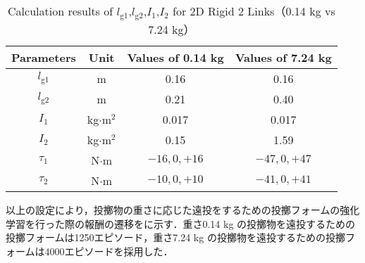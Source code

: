 \begin{table}[tb]
  \begin{center}
    \caption{Calculation results of $l_{\mathrm{g1}}$,$l_{\mathrm{g2}}$,$I_{1}$,$I_{2}$ for 2D Rigid 2 Links（0.14 kg vs 7.24 kg）}
    \begin{tabular}{c|c|c|c}
      \hline
      Parameters & Unit & Values of 0.14 kg & Values of 7.24 kg \\
      \hline
      $l_{\mathrm{g1}}$ & m & 0.16 & 0.16 \\
      $l_{\mathrm{g2}}$ & m & 0.21 & 0.40 \\
      $I_{1}$ & kg$\cdot$$\mathrm{m}^2$ & 0.017 & 0.017 \\
      $I_{2}$ & kg$\cdot$$\mathrm{m}^2$ & 0.15 & 1.59 \\
      $\tau_{1}$ & N$\cdot$m & $-16, 0, +16$ & $-47, 0, +47 $\\
      $\tau_{2}$ & N$\cdot$m & $-10, 0, +10$ & $-41, 0, +41 $\\
      \hline
    \end{tabular}
  \end{center}
\end{table}

以上の設定により，投擲物の重さに応じた遠投をするための投擲フォームの強化学習を行った際の報酬の遷移をに示す．重さ0.14 kg の投擲物を遠投するための投擲フォームは1250エピソード，重さ7.24 kg の投擲物を遠投するための投擲フォームは4000エピソードを採用した．

